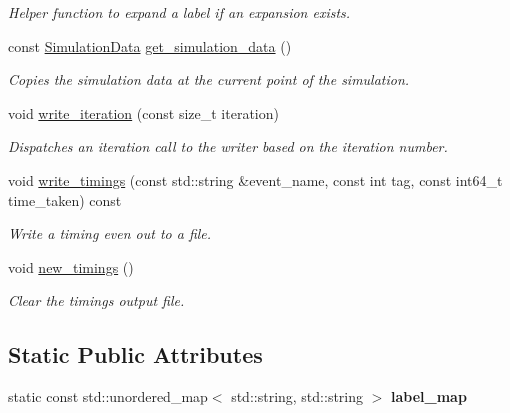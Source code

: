 \begin{DoxyCompactItemize}
\begin{DoxyCompactList}\small\item\em Helper function to expand a label if an expansion exists. \end{DoxyCompactList}\item 
const \mbox{\hyperlink{structwash_1_1io_1_1SimulationData}{Simulation\+Data}} \mbox{\hyperlink{classwash_1_1io_1_1IOManager_acd4d5358ca4bb964926dfc080a72475c}{get\+\_\+simulation\+\_\+data}} ()
\begin{DoxyCompactList}\small\item\em Copies the simulation data at the current point of the simulation. \end{DoxyCompactList}\item 
void \mbox{\hyperlink{classwash_1_1io_1_1IOManager_ab4670696bfb277a364f6112fc6f0d051}{write\+\_\+iteration}} (const size\+\_\+t iteration)
\begin{DoxyCompactList}\small\item\em Dispatches an iteration call to the writer based on the iteration number. \end{DoxyCompactList}\item 
void \mbox{\hyperlink{classwash_1_1io_1_1IOManager_ab2397361f7dc4f7b54b559d332bafb11}{write\+\_\+timings}} (const std\+::string \&event\+\_\+name, const int tag, const int64\+\_\+t time\+\_\+taken) const
\begin{DoxyCompactList}\small\item\em Write a timing even out to a file. \end{DoxyCompactList}\item 
\mbox{\label{classwash_1_1io_1_1IOManager_ae23d3d68354b0ba5b410992c60fe6762}} 
void \mbox{\hyperlink{classwash_1_1io_1_1IOManager_ae23d3d68354b0ba5b410992c60fe6762}{new\+\_\+timings}} ()
\begin{DoxyCompactList}\small\item\em Clear the timings output file. \end{DoxyCompactList}\end{DoxyCompactItemize}
\subsection*{Static Public Attributes}
\begin{DoxyCompactItemize}
\item 
static const std\+::unordered\+\_\+map$<$ std\+::string, std\+::string $>$ {\bfseries label\+\_\+map}
\end{DoxyCompactItemize}


